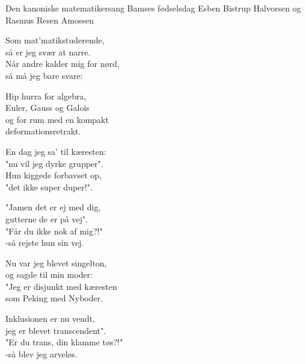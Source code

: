 \begin{song}{Den kanoniske matematikersang}
  {} %
  {Bamses fødselsdag}
  {Esben Bistrup Halvorsen og Rasmus Resen Amossen}
  {}
  {\NotCCLIed}

  \begin{SBVerse}
	Som mat'matikstuderende,\\
	så er jeg svær at narre.\\
	Når andre kalder mig for nørd,\\
	så må jeg bare svare:
  \end{SBVerse}

  \begin{SBChorus}
	Hip hurra for algebra,\\
	Euler, Gauss og Galois\\
	og for rum med en kompakt\\
	deformationsretrakt.
  \end{SBChorus}

  \begin{SBVerse}
	En dag jeg sa' til kæresten:\\
	"nu vil jeg dyrke grupper".\\
	Hun kiggede forbavset op,\\
	"det ikke super duper!".
  \end{SBVerse}

  \begin{SBSection*}
	"Jamen det er ej med dig,\\
	gutterne de er på vej".\\
	"Får du ikke nok af mig?!"\\
	 -så rejste hun sin vej.\\
  \end{SBSection*}

  \begin{SBVerse}
	Nu var jeg blevet singelton,\\
	og sagde til min moder:\\
	"Jeg er disjunkt med kæresten\\
	som Peking med Nyboder.
  \end{SBVerse}

  \begin{SBSection*}
	Inklusionen er nu vendt,\\
	jeg er blevet transcendent".\\
	"Er du trans, din klamme tøs?!"\\
	-så blev jeg arveløs.
  \end{SBSection*}


\end{song}
